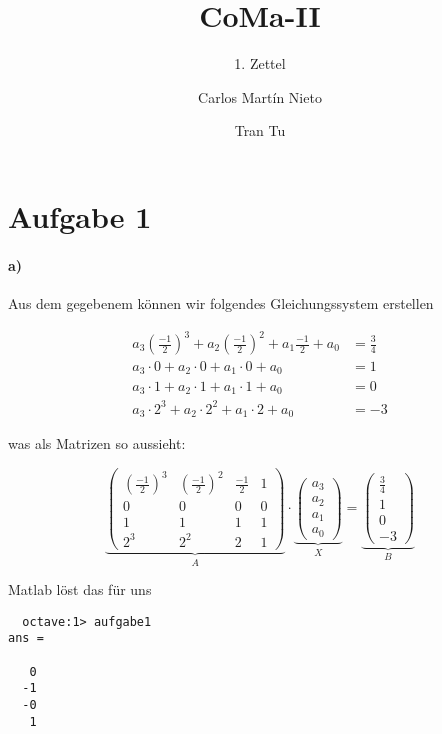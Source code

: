 \documentclass[a4paper,ngerman]{scrartcl}
\begin{document}
\title{CoMa-II}
\subtitle{1. Zettel}
\author{Carlos Martín Nieto \and Tran Tu}
\maketitle

\section*{Aufgabe 1}
\paragraph{a)}
Aus dem gegebenem können wir folgendes Gleichungssystem erstellen

\begin{align*}
  a_3 \left(\frac{-1}{2}\right)^3 + a_2\left(\frac{-1}{2}\right)^2 + a_1\frac{-1}{2} + a_0 &= \frac{3}{4}\\
  a_3 \cdot 0 + a_2 \cdot 0 + a_1 \cdot 0 + a_0 &= 1\\
  a_3 \cdot 1 + a_2 \cdot 1 + a_1 \cdot 1 + a_0 &= 0\\
  a_3 \cdot 2^3+ a_2 \cdot 2^2+ a_1 \cdot 2+ a_0 &= -3
\end{align*}

was als Matrizen so aussieht:

\[
\underbrace{\begin{pmatrix}
  \left(\frac{-1}{2}\right)^3 & \left(\frac{-1}{2}\right)^2 & \frac{-1}{2} & 1\\
  0 & 0 & 0 & 0\\
  1 & 1 & 1 & 1\\
  2^3 & 2^2 & 2 & 1
\end{pmatrix}}_{A}\cdot
\underbrace{\begin{pmatrix}
  a_3\\ a_2\\ a_1\\ a_0
\end{pmatrix}}_{X} =
\underbrace{\begin{pmatrix}
  \frac{3}{4} \\ 1 \\ 0 \\ -3
\end{pmatrix}}_{B}
\]

Matlab löst das für uns

\begin{minipage}{0.4\linewidth}
\begin{lstlisting}
  octave:1> aufgabe1
ans =

   0
  -1
  -0
   1
\end{lstlisting}
\end{minipage}
\begin{minipage}{0.6\linewidth}
  
\end{minipage}
\end{document}
